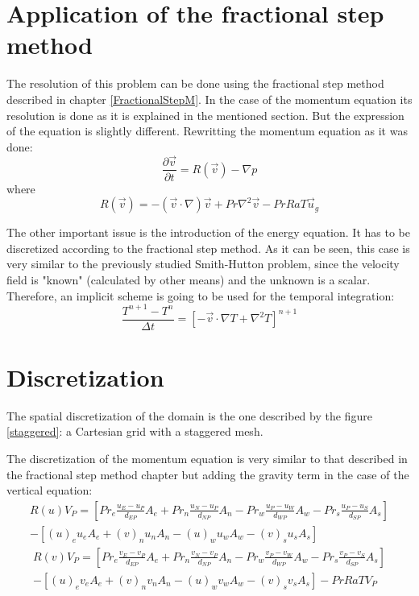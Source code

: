 \section{Application of the fractional step method}
The resolution of this problem can be done using the fractional step method described in chapter \ref{FractionalStepM}. In the case of the momentum equation its resolution is done as it is explained in the mentioned section. But the expression of the equation is slightly different. Rewritting the momentum equation as it was done:
\begin{equation}
\frac{\partial\vec{v}}{\partial t}=R\left(\vec{v}\right)-\nabla p
\end{equation}
where
\begin{equation}
R\left(\vec{v}\right)=-\left(\vec{v}\cdot\nabla\right)\vec{v}+Pr\nabla^{2}\vec{v}-PrRaT\vec{u}_{g}
\end{equation}

The other important issue is the introduction of the energy equation. It has to be discretized according to the fractional step method. As it can be seen, this case is very similar to the previously studied Smith-Hutton problem, since the velocity field is "known" (calculated by other means) and the unknown is a scalar. Therefore, an implicit scheme is going to be used for the temporal integration:
\begin{equation}
\frac{T^{n+1}-T^{n}}{\Delta t}=\left[-\vec{v}\cdot\nabla T+\nabla^{2}T\right]^{n+1}
\end{equation}

\section{Discretization}
The spatial discretization of the domain is the one described by the figure \ref{staggered}: a Cartesian grid with a staggered mesh.

The discretization of the momentum equation is very similar to that described in the fractional step method chapter but adding the gravity term in the case of the vertical equation:
\begin{multline}
	R\left(u\right)V_{P}=\left[Pr_{e}\frac{u_{E}-u_{P}}{d_{EP}}A_{e}+Pr_{n}\frac{u_{N}-u_{P}}{d_{NP}}A_{n}-Pr_{w}\frac{u_{P}-u_{W}}{d_{WP}}A_{w}-Pr_{s}\frac{u_{P}-u_{S}}{d_{SP}}A_{s}\right] \\
	-\left[\left(u\right)_{e}u_{e}A_{e}+\left(v\right)_{n}u_{n}A_{n}-\left(u\right)_{w}u_{w}A_{w}-\left(v\right)_{s}u_{s}A_{s}\right]
\end{multline}
\begin{multline}
	R\left(v\right)V_{P}=\left[Pr_{e}\frac{v_{E}-v_{P}}{d_{EP}}A_{e}+Pr_{n}\frac{v_{N}-v_{P}}{d_{NP}}A_{n}-Pr_{w}\frac{v_{P}-v_{W}}{d_{WP}}A_{w}-Pr_{s}\frac{v_{P}-v_{S}}{d_{SP}}A_{s}\right] \\
	-\left[\left(u\right)_{e}v_{e}A_{e}+\left(v\right)_{n}v_{n}A_{n}-\left(u\right)_{w}v_{w}A_{w}-\left(v\right)_{s}v_{s}A_{s}\right]-PrRaTV_{P}
\end{multline}

